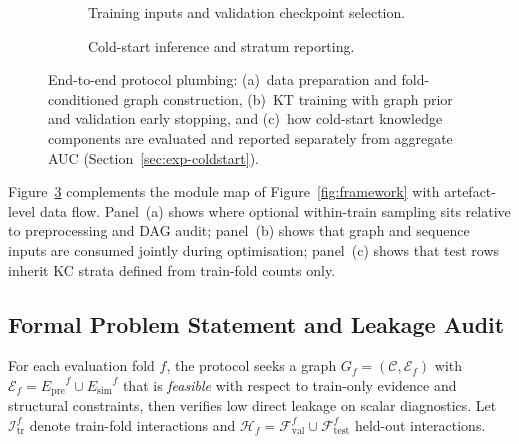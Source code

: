 \documentclass[pdflatex,sn-mathphys-num]{sn-jnl}
\newcommand{\Epre}{\ensuremath{E_{\text{pre}}}}
\newcommand{\Esim}{\ensuremath{E_{\text{sim}}}}
\newcommand{\KCs}{knowledge components}
\begin{document}
\begin{figure}[!t]
\begin{subfigure}[t]{0.32\linewidth}
\caption{Training inputs and validation checkpoint selection.}
\label{fig:pipe-train}
\end{subfigure}\hfill
\begin{subfigure}[t]{0.32\linewidth}
\centering
{}
\caption{Cold-start inference and stratum reporting.}
\label{fig:pipe-infer}
\end{subfigure}
\caption{End-to-end protocol plumbing: (a)~data preparation and fold-conditioned
graph construction, (b)~KT training with graph prior and validation early
stopping, and (c)~how cold-start \KCs{} are evaluated and reported separately
from aggregate AUC (Section~\ref{sec:exp-coldstart}).}
\label{fig:pipelines}
\end{figure}

Figure~\ref{fig:pipelines} complements the module map of
Figure~\ref{fig:framework} with artefact-level data flow. Panel~(a) shows
where optional within-train sampling sits relative to preprocessing and DAG
audit; panel~(b) shows that graph and sequence inputs are consumed jointly
during optimisation; panel~(c) shows that test rows inherit KC strata defined
from train-fold counts only.

\subsection{Formal Problem Statement and Leakage Audit}
\label{sec:formal-problem}
For each evaluation fold $f$, the protocol seeks a graph
$G_f=(\mathcal{C},\mathcal{E}_f)$ with $\mathcal{E}_f=\Epre^f\cup\Esim^f$
that is \emph{feasible} with respect to train-only evidence and
structural constraints, then verifies low direct leakage on scalar
diagnostics. Let $\mathcal{I}_{\text{tr}}^f$ denote train-fold
interactions and $\mathcal{H}_f=\mathcal{F}_{\text{val}}^f\cup
\mathcal{F}_{\text{test}}^f$ held-out interactions.
\end{document}
